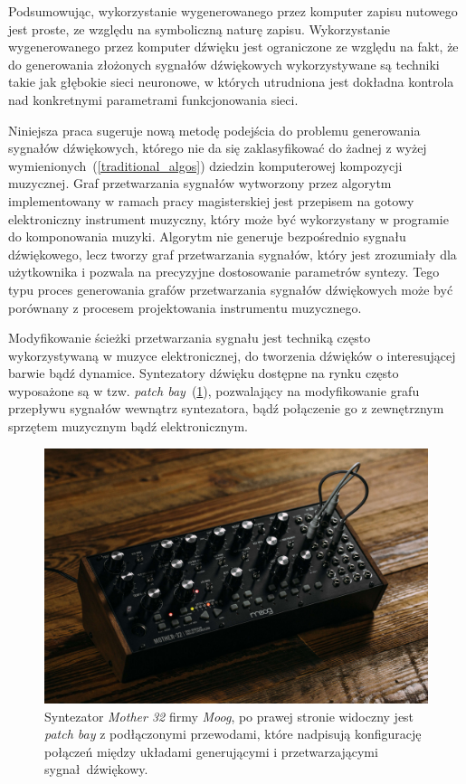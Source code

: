 Podsumowując, wykorzystanie wygenerowanego przez komputer zapisu nutowego jest proste, ze względu na symboliczną naturę zapisu.
Wykorzystanie wygenerowanego przez komputer dźwięku jest ograniczone ze względu na fakt, że do generowania złożonych sygnałów dźwiękowych wykorzystywane są techniki takie jak głębokie sieci neuronowe, w których utrudniona jest dokładna kontrola nad konkretnymi parametrami funkcjonowania sieci.

Niniejsza praca sugeruje nową metodę podejścia do problemu generowania sygnałów dźwiękowych,
którego nie da się zaklasyfikować do żadnej z wyżej wymienionych~(\ref{traditional_algos}) dziedzin komputerowej kompozycji muzycznej.
Graf przetwarzania sygnałów wytworzony przez algorytm implementowany w ramach pracy magisterskiej jest przepisem na gotowy elektroniczny instrument muzyczny,
który może być wykorzystany w programie do komponowania muzyki. Algorytm nie generuje bezpośrednio sygnału dźwiękowego, lecz tworzy
graf przetwarzania sygnałów, który jest zrozumiały dla użytkownika i pozwala na precyzyjne dostosowanie parametrów syntezy.
Tego typu proces generowania grafów przetwarzania sygnałów dźwiękowych może być porównany z procesem projektowania instrumentu muzycznego.

Modyfikowanie ścieżki przetwarzania sygnału jest techniką często wykorzystywaną w muzyce
elektronicznej, do tworzenia dźwięków o interesującej barwie bądź dynamice. Syntezatory dźwięku
dostępne na rynku często wyposażone są w tzw. \textit{patch bay}~(\ref{fig:mother32}), pozwalający na modyfikowanie
grafu przepływu sygnałów wewnątrz syntezatora, bądź połączenie go z zewnętrznym sprzętem muzycznym
bądź elektronicznym.

\begin{figure}[H]
    \centering
    \includegraphics[width=0.7\linewidth]{rys01/mother32.jpg}
    \caption{
      Syntezator \textit{Mother 32} firmy \textit{Moog}, po prawej stronie widoczny
      jest \textit{patch bay} z podłączonymi przewodami, które nadpisują konfigurację
      połączeń między układami generującymi i przetwarzającymi sygnał dźwiękowy.
    }\label{fig:mother32}
\end{figure}


